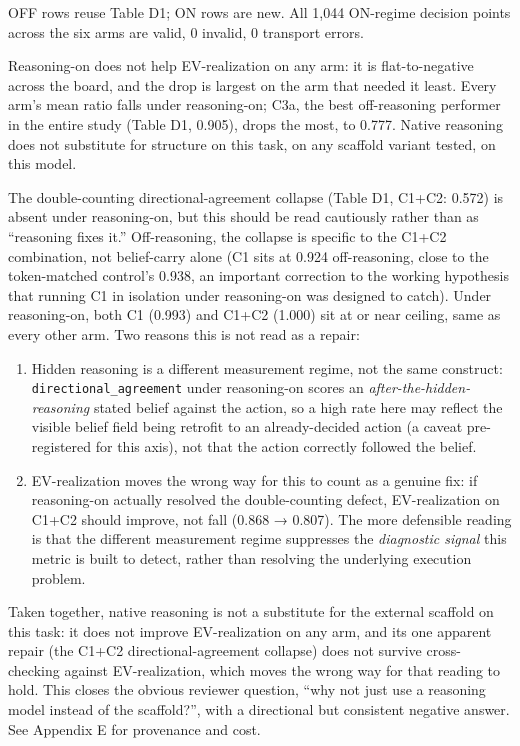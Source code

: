 \documentclass[
  11pt,
]{article}
\providecommand{\tightlist}{%
  \setlength{\itemsep}{0pt}\setlength{\parskip}{0pt}}
\begin{document}
OFF rows reuse Table D1; ON rows are new. All 1,044 ON-regime decision points across the six arms are valid, 0 invalid, 0 transport errors.

Reasoning-on does not help EV-realization on any arm: it is flat-to-negative across the board, and the drop is largest on the arm that needed it least. Every arm's mean ratio falls under reasoning-on; C3a, the best off-reasoning performer in the entire study (Table D1, 0.905), drops the most, to 0.777. Native reasoning does not substitute for structure on this task, on any scaffold variant tested, on this model.

The double-counting directional-agreement collapse (Table D1, C1+C2: 0.572) is absent under reasoning-on, but this should be read cautiously rather than as ``reasoning fixes it.'' Off-reasoning, the collapse is specific to the C1+C2 combination, not belief-carry alone (C1 sits at 0.924 off-reasoning, close to the token-matched control's 0.938, an important correction to the working hypothesis that running C1 in isolation under reasoning-on was designed to catch). Under reasoning-on, both C1 (0.993) and C1+C2 (1.000) sit at or near ceiling, same as every other arm. Two reasons this is not read as a repair:

\begin{enumerate}
\def\labelenumi{\arabic{enumi}.}
\tightlist
\item
  Hidden reasoning is a different measurement regime, not the same construct: \texttt{directional\_agreement} under reasoning-on scores an \emph{after-the-hidden-reasoning} stated belief against the action, so a high rate here may reflect the visible belief field being retrofit to an already-decided action (a caveat pre-registered for this axis), not that the action correctly followed the belief.
\item
  EV-realization moves the wrong way for this to count as a genuine fix: if reasoning-on actually resolved the double-counting defect, EV-realization on C1+C2 should improve, not fall (0.868 → 0.807). The more defensible reading is that the different measurement regime suppresses the \emph{diagnostic signal} this metric is built to detect, rather than resolving the underlying execution problem.
\end{enumerate}

Taken together, native reasoning is not a substitute for the external scaffold on this task: it does not improve EV-realization on any arm, and its one apparent repair (the C1+C2 directional-agreement collapse) does not survive cross-checking against EV-realization, which moves the wrong way for that reading to hold. This closes the obvious reviewer question, ``why not just use a reasoning model instead of the scaffold?'', with a directional but consistent negative answer. See Appendix E for provenance and cost.
\end{document}

